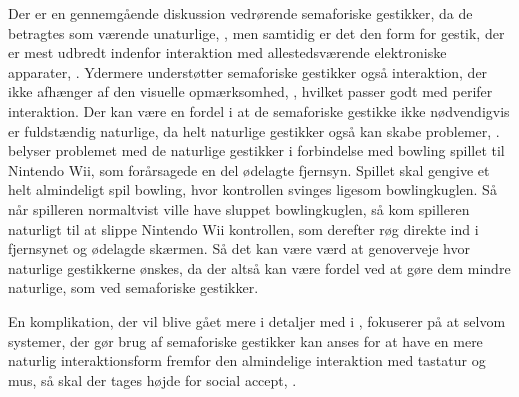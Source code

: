 Der er en gennemgående diskussion vedrørende semaforiske gestikker, da de betragtes som værende unaturlige, \parencite[s. 1961]{PDF:AStudyOnTheUseOfSemaphoricGestures}, men samtidig er det den form for gestik, der er mest udbredt indenfor interaktion med allestedsværende elektroniske apparater, \parencite[s. 28]{PDF:ATaxonomyOfGestures}. Ydermere understøtter semaforiske gestikker også interaktion, der ikke afhænger af den visuelle opmærksomhed, \parencite[s. 1964]{PDF:AStudyOnTheUseOfSemaphoricGestures}, hvilket passer godt med perifer interaktion. Der kan være en fordel i at de semaforiske gestikke ikke nødvendigvis er fuldstændig naturlige, da helt naturlige gestikker også kan skabe problemer, \parencite[s. 9]{PDF:NaturalUserInterfaces}. \textcite[s. 9]{PDF:NaturalUserInterfaces} belyser problemet med de naturlige gestikker i forbindelse med bowling spillet til Nintendo Wii, som forårsagede en del ødelagte fjernsyn. Spillet skal gengive et helt almindeligt spil bowling, hvor kontrollen svinges ligesom bowlingkuglen. Så når spilleren normaltvist ville have sluppet bowlingkuglen, så kom spilleren naturligt til at slippe Nintendo Wii kontrollen, som derefter røg direkte ind i fjernsynet og ødelagde skærmen. Så det kan være værd at genoverveje hvor naturlige gestikkerne ønskes, da der altså kan være fordel ved at gøre dem mindre naturlige, som ved semaforiske gestikker.

En komplikation, der vil blive gået mere i detaljer med i , fokuserer på at selvom systemer, der gør brug af semaforiske gestikker kan anses for at have en mere naturlig interaktionsform fremfor den almindelige interaktion med tastatur og mus, så skal der tages højde for social accept, \parencite[s. 275]{PDF:WouldYouDoThat}. 
%
